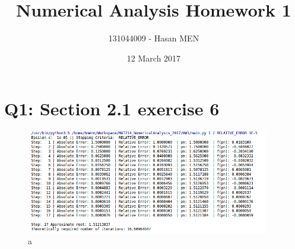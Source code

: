 \documentclass{article}
\title{Numerical Analysis Homework 1}
\author{131044009 - Hasan MEN}
\date{12 March 2017}
\begin{document}
\maketitle

\section{Q1: Section 2.1 exercise 6}

\begin{figure}[h]
       \includegraphics[width=400px]{ss_2_2_6_a.png}
       \caption{a}
\end{figure}
\end{document}
